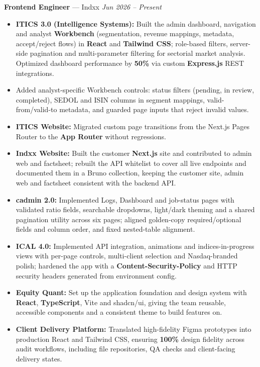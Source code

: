\documentclass[10pt,a4paper]{article}
\newcommand{\role}[3]{%
  \vspace{5pt}%
  \textbf{#1} \textnormal{\textcolor{midgrey}{--- #2}}%
  \hfill\textcolor{midgrey}{\textit{#3}}%
  \vspace{1pt}%
}
\begin{document}
\role{Frontend Engineer}{Indxx}{Jun 2026 -- Present}
\begin{itemize}
  \item \textbf{ITICS 3.0 (Intelligence Systems):} Built the admin dashboard, navigation and analyst \textbf{Workbench} (segmentation, revenue mappings, metadata, accept/reject flows) in \textbf{React} and \textbf{Tailwind CSS}; role-based filters, server-side pagination and multi-parameter filtering for sectorial market analysis. Optimized dashboard performance by \textbf{50\%} via custom \textbf{Express.js} REST integrations.
  \item Added analyst-specific Workbench controls: status filters (pending, in review, completed), SEDOL and ISIN columns in segment mappings, valid-from/valid-to metadata, and guarded page inputs that reject invalid values.
  \item \textbf{ITICS Website:} Migrated custom page transitions from the Next.js Pages Router to the \textbf{App Router} without regressions.
  \item \textbf{Indxx Website:} Built the customer \textbf{Next.js} site and contributed to admin web and factsheet; rebuilt the API whitelist to cover all live endpoints and documented them in a Bruno collection, keeping the customer site, admin web and factsheet consistent with the backend API.
  \item \textbf{cadmin 2.0:} Implemented Logs, Dashboard and job-status pages with validated ratio fields, searchable dropdowns, light/dark theming and a shared pagination utility across six pages; aligned golden-copy required/optional fields and column order, and fixed nested-table alignment.
  \item \textbf{ICAL 4.0:} Implemented API integration, animations and indices-in-progress views with per-page controls, multi-client selection and Nasdaq-branded polish; hardened the app with a \textbf{Content-Security-Policy} and HTTP security headers generated from environment config.
  \item \textbf{Equity Quant:} Set up the application foundation and design system with \textbf{React}, \textbf{TypeScript}, Vite and shadcn/ui, giving the team reusable, accessible components and a consistent theme to build features on.
  \item \textbf{Client Delivery Platform:} Translated high-fidelity Figma prototypes into production React and Tailwind CSS, ensuring \textbf{100\%} design fidelity across audit workflows, including file repositories, QA checks and client-facing delivery states.
\end{itemize}
\end{document}
